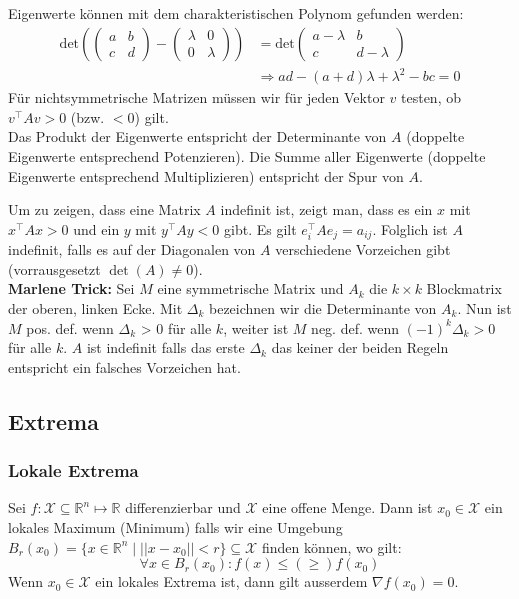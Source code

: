 \documentclass[a4paper,10pt]{article}
\def\R{\mathbb{R}}
\def\X{\mathcal{X}}
\begin{document}
Eigenwerte können mit dem charakteristischen Polynom gefunden werden:
\begin{align*}
  \text{det} \left(
  \begin{pmatrix}
    a & b\\
    c & d
  \end{pmatrix}
  -
  \begin{pmatrix}
    \lambda & 0\\
    0 & \lambda
  \end{pmatrix}
  \right)
  &=
  \text{det}
  \begin{pmatrix}
    a - \lambda & b\\
    c & d - \lambda
  \end{pmatrix}\\
  &\Rightarrow ad - (a + d) \lambda + \lambda^2 - bc = 0
\end{align*}
Für nichtsymmetrische Matrizen müssen wir für jeden Vektor \(v\) testen, ob \(v^\top A v > 0\) (bzw. \(< 0\)) gilt.\\
Das Produkt der Eigenwerte entspricht der Determinante von $A$ (doppelte Eigenwerte entsprechend Potenzieren). Die Summe aller Eigenwerte (doppelte Eigenwerte entsprechend Multiplizieren) entspricht der Spur von $A$.

Um zu zeigen, dass eine Matrix $A$ indefinit ist, zeigt man, dass es ein $x$ mit $x^\top A x > 0$ und ein $y$ mit $y^\top A y < 0$ gibt. Es gilt $e_i^\top A e_j = a_{ij}$. Folglich ist $A$ indefinit, falls es auf der Diagonalen von $A$ verschiedene Vorzeichen gibt (vorrausgesetzt $\det(A) \neq 0$).\\

\textbf{Marlene Trick:} Sei $M$ eine symmetrische Matrix und $A_k$ die $k \times k$ Blockmatrix der oberen, linken Ecke. Mit $\Delta_k$ bezeichnen wir die Determinante von $A_k$. Nun ist $M$ pos. def. wenn $\Delta_k$ > 0 für alle $k$, weiter ist $M$ neg. def.
wenn $(-1)^k \Delta_k > 0$ für alle $k$. $A$ ist indefinit falls das erste $\Delta_k$ das keiner der beiden Regeln entspricht ein falsches Vorzeichen hat.

\subsection{Extrema}
\subsubsection*{Lokale Extrema}
Sei \(f: \X \subseteq \R^n \mapsto \R\) differenzierbar und \(\X\) eine offene Menge. Dann ist \(x_0 \in \X\) ein lokales Maximum (Minimum) falls wir eine Umgebung \(B_r(x_0) = \{x\in \R^n \mid ||x-x_0|| < r \} \subseteq \X\) finden können, wo gilt:
\[\forall x \in B_r(x_0): f(x) \le (\ge) f(x_0)\]
Wenn \(x_0 \in \X\) ein lokales Extrema ist, dann gilt ausserdem \(\nabla f(x_0) = 0\).
\end{document}
